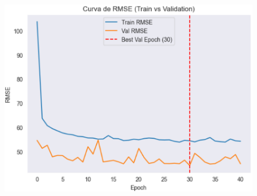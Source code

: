 \begin{figure}[H]
\begin{minipage}{0.48\textwidth}
		\vspace{0.2cm}
		\includegraphics[width=\linewidth]{includes/cap5/graphs/sid1_trafficformer_rmse.png}
	\end{minipage}
	\label{fig:curvas_sid1_trafficformer}
\end{figure}


